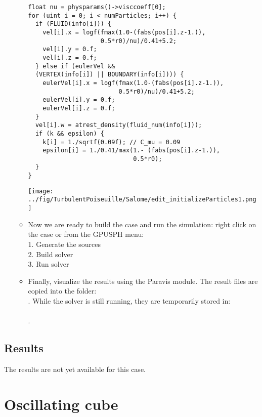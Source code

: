 \documentclass{../GPUSPHtemplate}
\begin{document}
\begin{enumerate}
\begin{itemize}
\begin{lstlisting}
float nu = physparams()->visccoeff[0];
for (uint i = 0; i < numParticles; i++) {
  if (FLUID(info[i])) {
    vel[i].x = logf(fmax(1.0-(fabs(pos[i].z-1.)),
                    0.5*r0)/nu)/0.41+5.2;
    vel[i].y = 0.f;
    vel[i].z = 0.f;
  } else if (eulerVel &&
  (VERTEX(info[i]) || BOUNDARY(info[i]))) {
    eulerVel[i].x = logf(fmax(1.0-(fabs(pos[i].z-1.)),
                         0.5*r0)/nu)/0.41+5.2;
    eulerVel[i].y = 0.f;
    eulerVel[i].z = 0.f;
  }
  vel[i].w = atrest_density(fluid_num(info[i]));
  if (k && epsilon) {
    k[i] = 1./sqrtf(0.09f); // C_mu = 0.09
    epsilon[i] = 1./0.41/max(1.- (fabs(pos[i].z-1.)),
                             0.5*r0);
  }
}
    \end{lstlisting}
    \texttt{[image: ../fig/TurbulentPoiseuille/Salome/edit\_initializeParticles1.png]}\medskip
  \item Now we are ready to build the case and run the simulation: right click on the case or from the GPUSPH menu:\\
    1. Generate the sources\\
    2. Build solver\\
    3. Run solver
  \item Finally, visualize the results using the Paravis module. The result files are copied into the folder:\\
    . While the solver is still running, they are temporarily stored in:\\
    \\
    .
  \end{itemize}
\end{enumerate}

\subsection{Results}
The results are not yet available for this case.

\section{Oscillating cube}
\end{document}
